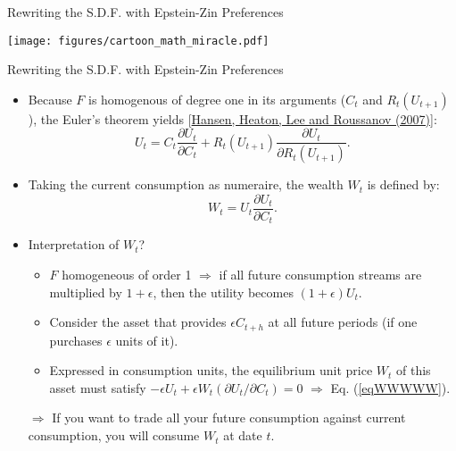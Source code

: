 \begin{frame}{Rewriting the S.D.F. with Epstein-Zin Preferences}
\begin{center}
		\texttt{[image: figures/cartoon\_math\_miracle.pdf]}
\end{center}
\end{frame}


\begin{frame}{Rewriting the S.D.F. with Epstein-Zin Preferences}
\begin{footnotesize}
\begin{itemize}
	\item Because $F$ is homogenous of degree one in its arguments ($C_t$ and $R_t(U_{t+1})$), the Euler's theorem yields [\href{https://bfi.uchicago.edu/sites/default/files/research/Intertemporal\%20Substitution\%20and\%20Risk\%20Aversion.pdf}{Hansen, Heaton, Lee and Roussanov (2007)}]:
	\begin{equation}\label{eq:XXYXX}
	U_t = C_t \frac{\partial U_t}{\partial C_t} +  R_t(U_{t+1}) \frac{\partial U_t}{\partial R_t(U_{t+1})}.
	\end{equation}
	\item Taking the current consumption as numeraire, the wealth $W_t$ is defined by:
	\begin{equation}\label{eqWWWWW}
	W_t = 	U_t \frac{\partial U_t}{\partial C_t}.
	\end{equation}
	\item Interpretation of $W_t$?
	\begin{itemize}
		\item $F$ homogeneous of order 1 $\Rightarrow$ if all future consumption streams are multiplied by $1+\epsilon$, then the utility becomes $(1+\epsilon)U_t$.
		\item Consider the asset that provides $\epsilon C_{t+h}$ at all future periods (if one purchases $\epsilon$ units of it).
		\item Expressed in consumption units, the equilibrium unit price $W_t$ of this asset must satisfy $-\epsilon U_t + \epsilon W_t (\partial U_t / \partial C_t)=0$ $\Rightarrow$ Eq. (\ref{eqWWWWW}).
	\end{itemize}
		\item[$\Rightarrow$] If you want to trade all your future consumption against current consumption, you will consume $W_t$ at date $t$.
\end{itemize}
\end{footnotesize}
\end{frame}

